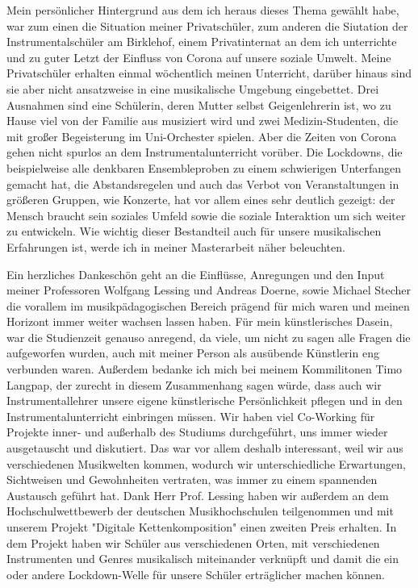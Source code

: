 
Mein persönlicher Hintergrund aus dem ich heraus dieses Thema gewählt habe, war
zum einen die Situation meiner Privatschüler, zum anderen die Siutation der
Instrumentalschüler am Birklehof, einem Privatinternat an dem ich unterrichte
und zu guter Letzt der Einfluss von Corona auf unsere soziale Umwelt. Meine
Privatschüler erhalten einmal wöchentlich meinen Unterricht, darüber hinaus sind
sie aber nicht ansatzweise in eine musikalische Umgebung eingebettet. Drei
Ausnahmen sind eine Schülerin, deren Mutter selbst Geigenlehrerin ist, wo zu
Hause viel von der Familie aus musiziert wird und zwei Medizin-Studenten, die
mit großer Begeisterung im Uni-Orchester spielen. Aber die Zeiten von Corona
gehen nicht spurlos an dem Instrumentalunterricht vorüber. Die Lockdowns, die
beispielweise alle denkbaren Ensembleproben zu einem schwierigen Unterfangen
gemacht hat, die Abstandsregelen und auch das Verbot von Veranstaltungen in
größeren Gruppen, wie Konzerte, hat vor allem eines sehr deutlich gezeigt: der
Mensch braucht sein soziales Umfeld sowie die soziale Interaktion um sich weiter
zu entwickeln. Wie wichtig dieser Bestandteil auch für unsere musikalischen
Erfahrungen ist, werde ich in meiner Masterarbeit näher beleuchten.

Ein herzliches Dankeschön geht an die Einflüsse, Anregungen und den Input meiner
Professoren Wolfgang Lessing und Andreas Doerne, sowie Michael Stecher die
vorallem im musikpädagogischen Bereich prägend für mich waren und meinen
Horizont immer weiter wachsen lassen haben. Für mein künstlerisches Dasein, war
die Studienzeit genauso anregend, da viele, um nicht zu sagen alle Fragen die
aufgeworfen wurden, auch mit meiner Person als ausübende Künstlerin eng
verbunden waren. Außerdem bedanke ich mich bei meinem Kommilitonen Timo Langpap,
der zurecht in diesem Zusammenhang sagen würde, dass auch wir Instrumentallehrer
unsere eigene künstlerische Persönlichkeit pflegen und in den
Instrumentalunterricht einbringen müssen. Wir haben viel Co-Working für Projekte
inner- und außerhalb des Studiums durchgeführt, uns immer wieder ausgetauscht und
diskutiert. Das war vor allem deshalb interessant, weil wir aus verschiedenen
Musikwelten kommen, wodurch wir unterschiedliche  Erwartungen, Sichtweisen und
Gewohnheiten vertraten, was immer zu einem spannenden Austausch geführt hat.
Dank Herr Prof. Lessing haben wir außerdem an dem Hochschulwettbewerb der
deutschen Musikhochschulen teilgenommen und mit unserem Projekt "Digitale
Kettenkomposition" einen zweiten Preis erhalten. In dem Projekt haben wir
Schüler aus verschiedenen Orten, mit verschiedenen Instrumenten und Genres
musikalisch miteinander verknüpft und damit die ein oder andere Lockdown-Welle
für unsere Schüler erträglicher machen können. 

